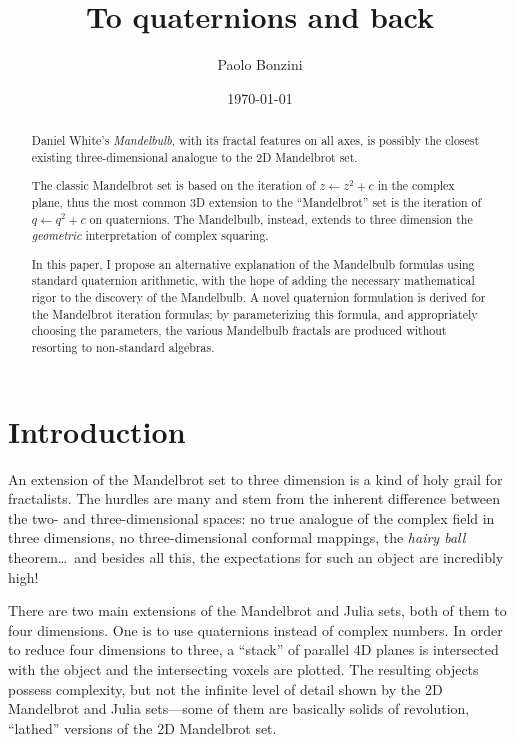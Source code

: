 \documentclass{article}
\title{To quaternions and back}
\date{\today}
\author{Paolo Bonzini}
\begin{document}
\maketitle


\begin{abstract}
  Daniel White's \emph{Mandelbulb}, with its fractal features on all axes,
  is possibly the closest existing three-dimensional analogue to the 2D
  Mandelbrot set.

  The classic Mandelbrot set is based on the iteration of $z\leftarrow
  z^2+c$ in the complex plane, thus the most common 3D extension
  to the ``Mandelbrot'' set is the iteration of $q\leftarrow q^2+c$
  on quaternions.  The Mandelbulb, instead, extends to three dimension
  the \emph{geometric} interpretation of complex squaring.

  In this paper, I propose an alternative explanation of the Mandelbulb
  formulas using standard quaternion arithmetic, with the hope of adding
  the necessary mathematical rigor to the discovery of the Mandelbulb.
  A novel quaternion formulation is derived for the Mandelbrot iteration
  formulas; by parameterizing this formula, and appropriately choosing
  the parameters, the various Mandelbulb fractals are produced without
  resorting to non-standard algebras.
\end{abstract}

\section{Introduction}

An extension of the Mandelbrot set to three dimension is a kind of holy
grail for fractalists.  The hurdles are many and stem from the inherent
difference between the two- and three-dimensional spaces: no true analogue
of the complex field in three dimensions, no three-dimensional conformal
mappings, the \emph{hairy ball} theorem\dots\ and besides all this,
the expectations for such an object are incredibly high!

There are two main extensions of the Mandelbrot and Julia sets, both
of them to four dimensions.  One is to use quaternions instead of
complex numbers.  In order to reduce four dimensions to three, a
``stack'' of parallel 4D planes is intersected with the object and the
intersecting voxels are plotted.  The resulting objects possess
complexity, but not the infinite level of detail shown by the 2D
Mandelbrot and Julia sets---some of them are basically solids of
revolution, ``lathed'' versions of the 2D Mandelbrot set.
\end{document}
